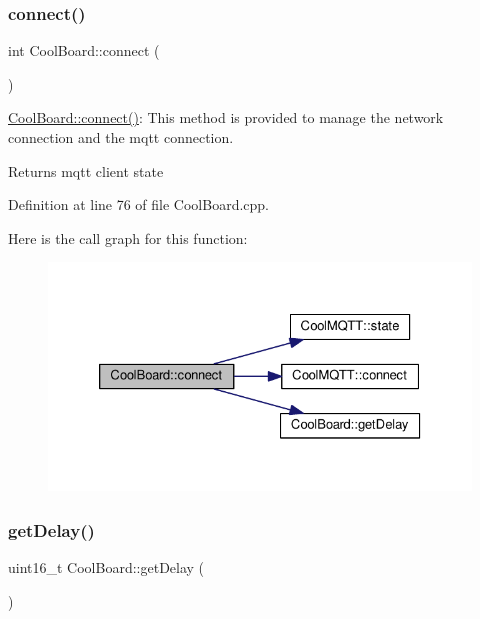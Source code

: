\subsubsection{\texorpdfstring{connect()}{connect()}}
{\footnotesize\ttfamily int Cool\+Board\+::connect (\begin{DoxyParamCaption}{ }\end{DoxyParamCaption})}

\hyperlink{class_cool_board_a519de78b807f8ec6463ff484eb925918}{Cool\+Board\+::connect()}\+: This method is provided to manage the network connection and the mqtt connection.

\begin{DoxyReturn}{Returns}
mqtt client state 
\end{DoxyReturn}


Definition at line 76 of file Cool\+Board.\+cpp.

Here is the call graph for this function\+:\nopagebreak
\begin{figure}[H]
\begin{center}
\leavevmode
\includegraphics[width=326pt]{class_cool_board_a519de78b807f8ec6463ff484eb925918_cgraph}
\end{center}
\end{figure}
\mbox{\label{class_cool_board_a12c3b5fa0ee6cc2c7d397abfc78f0f43}} 
\subsubsection{\texorpdfstring{get\+Delay()}{getDelay()}}
{\footnotesize\ttfamily uint16\+\_\+t Cool\+Board\+::get\+Delay (\begin{DoxyParamCaption}{ }\end{DoxyParamCaption})}

